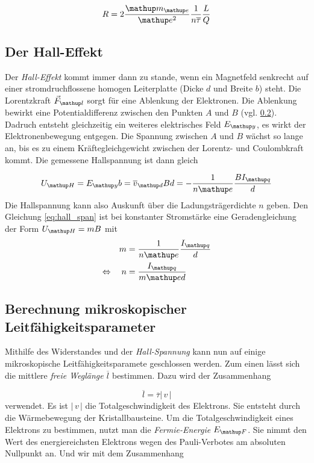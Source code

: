 \begin{equation}
\label{eq:wider}
R=2\frac{\map{m}\ua{e}}{\map{e}^2}\frac{1}{n\overline{\tau}}\frac{L}{Q}
\end{equation}
\subsection{Der Hall-Effekt}
Der \emph{Hall-Effekt} kommt immer dann zu stande, wenn 
ein Magnetfeld senkrecht auf einer stromdruchflossene
homogen Leiterplatte (Dicke $d$ und Breite $b$) steht.
Die Lorentzkraft $\vec{F}\ua{l}$ sorgt für eine Ablenkung der Elektronen.
Die Ablenkung bewirkt eine Potentialdifferenz zwischen den 
Punkten $A$ und $B$ (vgl. \ref{}). Dadruch entsteht gleichzeitig ein
weiteres elektrisches Feld $E\ua{y}$, es wirkt der Elektronenbewegung entgegen.
Die Spannung zwischen $A$ und $B$ wächst so lange an, bis es zu einem Kräftegleichgewicht zwischen der Lorentz- und Coulombkraft kommt.
Die gemessene Hallspannung ist  dann gleich

\begin{equation}
\label{eq:hall_span}
U\ua{H}=E\ua{y}b=\overline{v}\ua{d}Bd=-\frac{1}{n\map{e}}\frac{BI\ua{q}}{d}
\end{equation}
Die Hallspannung kann also Auskunft über die Ladungsträgerdichte $n$ geben.
Den Gleichung \eqref{eq:hall_span} ist bei konstanter Stromstärke eine Geradengleichung der Form $U\ua{H}=mB$ mit
\begin{align}
m&=\frac{1}{n\map{e}}\frac{I\ua{q}}{d} \notag \\
\Leftrightarrow \quad n&=\frac{I\ua{q}}{m\map{e}d}\label{eq:steig_teil_anz}
\end{align}


\subsection{Berechnung mikroskopischer Leitfähigkeitsparameter}
Mithilfe des Widerstandes und der \emph{Hall-Spannung} kann nun auf 
einige mikroskopische Leitfähigkeitsparamete geschlossen werden.
Zum einen lässt sich die mittlere \emph{freie Weglänge} $\overline{l}$ bestimmen.
Dazu wird der Zusammenhang

\begin{equation*}
\label{eq:freie_weg}
\overline{l}=\overline{\tau}\left|\,v\,\right|
\end{equation*}
verwendet.
Es ist $\left|\,v\,\right|$ die Totalgeschwindigkeit des Elektrons.
Sie entsteht durch die Wärmebewegung der Kristallbausteine.
Um die Totalgeschwindigkeit eines Elektrons zu bestimmen, nutzt 
man die \emph{Fermie-Energie} $E\ua{F}$. Sie nimmt den Wert des energiereichsten Elektrons wegen des 
Pauli-Verbotes am absoluten Nullpunkt an.
Und wir mit dem Zusammenhang 

